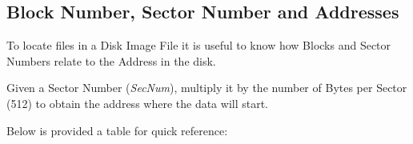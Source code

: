 \documentclass[a4paper,11pt]{article}
\begin{document}
    \subsection{Block Number, Sector Number and Addresses}

    To locate files in a Disk Image File it is useful to know how Blocks and
    Sector Numbers relate to the Address in the disk.

    Given a Sector Number (\textit{SecNum}), multiply it by the number of Bytes
    per Sector (512) to obtain the address where the data will start.

    Below is provided a table for quick reference:

\end{document}
